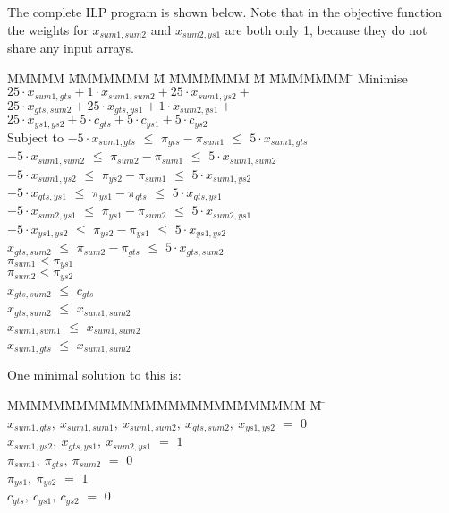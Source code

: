 The complete ILP program is shown below. Note that in the objective function the weights for $x_{sum1, sum2}$ and $x_{sum2, ys1}$ are both only 1, because they do not share any input arrays.

\begin{tabbing}
MMMMM   \= MMMMMMM \= M \= MMMMMMM \= M \= MMMMMMM \= \kill
Minimise   \> $25 \cdot x_{sum1, gts} + 1  \cdot x_{sum1,sum2} + 25 \cdot x_{sum1, ys2} +$ \\
           \> $25 \cdot x_{gts, sum2} + 25 \cdot x_{gts, ys1} + 1 \cdot x_{sum2, ys1} +$ \\
           \> $25 \cdot x_{ys1, ys2}  + 5  \cdot c_{gts} + 5 \cdot c_{ys1} + 5 \cdot c_{ys2} $
\\[1ex]
Subject to 
    \> $-5 \cdot x_{sum1, gts}$  \> $\le$ \> $\pi_{gts} - \pi_{sum1}$  \> $\le$ \> $5 \cdot x_{sum1, gts}$  \\
    \> $-5 \cdot x_{sum1, sum2}$ \> $\le$ \> $\pi_{sum2} - \pi_{sum1}$ \> $\le$ \> $5 \cdot x_{sum1, sum2}$ \\
    \> $-5 \cdot x_{sum1, ys2 }$ \> $\le$ \> $\pi_{ys2 } - \pi_{sum1}$ \> $\le$ \> $5 \cdot x_{sum1, ys2 }$ \\
    \> $-5 \cdot x_{gts,  ys1 }$ \> $\le$ \> $\pi_{ys1 } - \pi_{gts }$ \> $\le$ \> $5 \cdot x_{gts, ys1  }$ \\
    \> $-5 \cdot x_{sum2, ys1 }$ \> $\le$ \> $\pi_{ys1 } - \pi_{sum2}$ \> $\le$ \> $5 \cdot x_{sum2, ys1 }$ \\
    \> $-5 \cdot x_{ys1, ys2  }$ \> $\le$ \> $\pi_{ys2 } - \pi_{ys1 }$ \> $\le$ \> $5 \cdot x_{ys1, ys2  }$ 
\\[1ex]
    \> $   x_{gts, sum2 }$ \> $\le$ \> $\pi_{sum2} - \pi_{gts }$ \> $\le$ \> $5 \cdot x_{gts, sum2 }$ 
\\[1ex]
    \>                     \>       \> $\pi_{sum1} < \pi_{ys1}$ \\
    \>                     \>       \> $\pi_{sum2} < \pi_{ys2}$
\\[1ex]
    \> $ x_{gts,sum2} $    \> $\le$ \> $c_{gts}$
\\[1ex]
    \> $x_{gts, sum2}$     \> $\le$ \> $x_{sum1, sum2}$ \\
    \> $x_{sum1,sum1}$     \> $\le$ \> $x_{sum1, sum2}$ \\
    \> $x_{sum1, gts}$     \> $\le$ \> $x_{sum1, sum2}$
\end{tabbing}
\noindent

One minimal solution to this is:
\begin{tabbing}
MMMMMMMMMMMMMMMMMMMMMMMMMM \= M \= \kill
$x_{sum1, gts},~ x_{sum1, sum1},~ x_{sum1, sum2},~ x_{gts, sum2},~ x_{ys1,  ys2}$
    \> $=$ \> $0$ \\
$x_{sum1, ys2},~ x_{gts, ys1},~   x_{sum2, ys1}$
    \> $=$ \> $1$ 
\\[1ex]
$\pi_{sum1},~ \pi_{gts },~ \pi_{sum2}$
    \> $=$ \> $0$ \\
$\pi_{ys1 },~ \pi_{ys2 }$
    \> $=$ \> $1$ 
\\[1ex]
$c_{gts},~ c_{ys1},~ c_{ys2}$           
    \> $=$ \> $0$
\end{tabbing}

